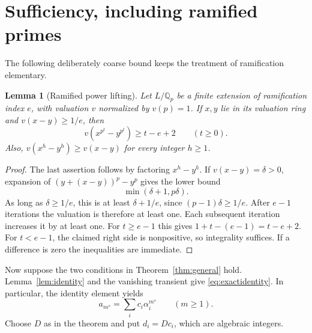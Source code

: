 \documentclass[11pt]{article}
\newtheorem{lemma}[theorem]{Lemma}
\theoremstyle{definition}
\theoremstyle{remark}
\newcommand{\Q}{\mathbb Q}
\begin{document}
\section{Sufficiency, including ramified primes}
The following deliberately coarse bound keeps the treatment of ramification elementary.
\begin{lemma}[Ramified power lifting]\label{lem:ramification}
Let $L/\Q_p$ be a finite extension of ramification index $e$, with valuation $v$ normalized by $v(p)=1$. If $x,y$ lie in its valuation ring and $v(x-y)\geq1/e$, then
\begin{equation}\label{eq:lifting}
 v(x^{p^t}-y^{p^t})\geq t-e+2\qquad(t\geq0).
\end{equation}
Also, $v(x^h-y^h)\geq v(x-y)$ for every integer $h\geq1$.
\end{lemma}
\begin{proof}
The last assertion follows by factoring $x^h-y^h$. If $v(x-y)=\delta>0$, expansion of $(y+(x-y))^p-y^p$ gives the lower bound
\[
 \min(\delta+1,p\delta).
\]
As long as $\delta\geq1/e$, this is at least $\delta+1/e$, since $(p-1)\delta\geq1/e$. After $e-1$ iterations the valuation is therefore at least one. Each subsequent iteration increases it by at least one. For $t\geq e-1$ this gives $1+t-(e-1)=t-e+2$. For $t<e-1$, the claimed right side is nonpositive, so integrality suffices. If a difference is zero the inequalities are immediate.
\end{proof}

Now suppose the two conditions in Theorem~\ref{thm:general} hold. Lemma~\ref{lem:identity} and the vanishing transient give \eqref{eq:exactidentity}. In particular, the identity element yields
\begin{equation}\label{eq:constantpart}
 a_{m^s}=\sum_i c_i\alpha_i^{m^s}\qquad(m\geq1).
\end{equation}
Choose $D$ as in the theorem and put $d_i=Dc_i$, which are algebraic integers.
\end{document}
